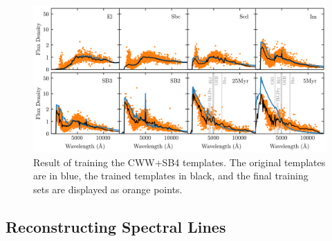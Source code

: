 \begin{figure}
    \centering
    \includegraphics{figures/cwwsb4_trained.png}
    \caption{Result of training the CWW+SB4 templates. The original templates are in blue, the trained templates in black, and the final training sets are displayed as orange points.}
    \label{fig:cwwsb4_trained}
\end{figure}


\subsection{Reconstructing Spectral Lines}


